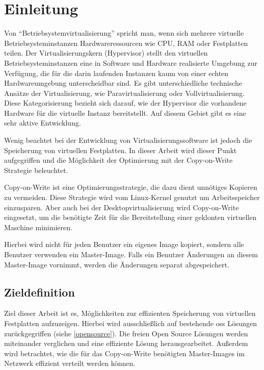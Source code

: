 \chapter{Einleitung}
Von ``Betriebsystemvirtualisierung'' spricht man, wenn sich mehrere virtuelle Betriebsysteminstanzen Hardwareressourcen wie CPU, RAM oder Festplatten teilen. Der Virtualisierungskern (Hypervisor) stellt den virtuellen Betriebsysteminstanzen eine in Software und Hardware realisierte Umgebung zur Verfügung, die für die darin laufenden Instanzen kaum von einer echten Hardwareumgebung unterscheidbar sind. Es gibt unterschiedliche technische Ansätze der Virtualisierung, wie Paravirtualisierung oder Vollvirtualisierung. Diese Kategorisierung bezieht sich darauf, wie der Hypervisor die vorhandene Hardware für die virtuelle Instanz bereitstellt. Auf diesem Gebiet gibt es eine sehr aktive Entwicklung. \cite{andrep} \cite{baun}

Wenig beachtet bei der Entwicklung von Virtualisierungssoftware ist jedoch die Speicherung von virtuellen Festplatten. In dieser Arbeit wird dieser Punkt aufgegriffen und die Möglichkeit der Optimierung mit der Copy-on-Write Strategie beleuchtet.

Copy-on-Write ist eine Optimierungsstrategie, die dazu dient unnötiges Kopieren zu vermeiden. Diese Strategie wird vom Linux-Kernel genutzt um Arbeitsspeicher einzusparen. Aber auch bei der Desktopvirtualisierung wird Copy-on-Write eingesetzt, um die benötigte Zeit für die Bereitstellung einer geklonten virtuellen Maschine minimieren.
\begin{comment}Zusätzlich werden die Systemressourcen (Storage, IO, CPU) des physikalischen Virtualisierungsservers geschont.\end{comment}
Hierbei wird nicht für jeden Benutzer ein eigenes Image kopiert, sondern alle Benutzer verwenden ein Master-Image. Falls ein Benutzer Änderungen an diesem Master-Image vornimmt, werden die Änderungen separat abgespeichert. 

\section{Zieldefinition}
Ziel dieser Arbeit ist es, Möglichkeiten zur effizienten Speicherung von virtuellen Festplatten aufzuzeigen. Hierbei wird ausschließlich auf bestehende \gls{oss} Lösungen zurückgegriffen (siehe \ref{opensource}). Die freien Open Source Lösungen werden miteinander verglichen und eine effiziente Lösung herausgearbeitet. Außerdem wird betrachtet, wie die für das Copy-on-Write benötigten Master-Images im Netzwerk effizient verteilt werden können.  \cite{vmware}

